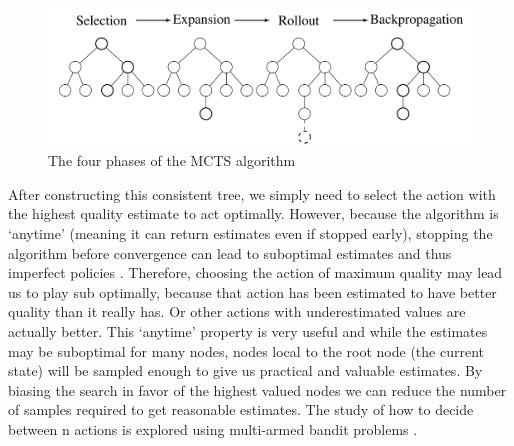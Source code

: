 \documentclass[msc, deptreport, ai, romanprepages]{infthesis}
\begin{document}
\begin{figure}[h]
\caption{The four phases of the MCTS algorithm}
\centering
\includegraphics[scale=.825]{figures/MCTS}
\end{figure}

After constructing this consistent tree, we simply need to select the action with the highest quality estimate to act optimally. However, because the algorithm is `anytime' (meaning it can return estimates even if stopped early), stopping the algorithm before convergence can lead to suboptimal estimates and thus imperfect policies \cite{Gelly}. Therefore, choosing the action of maximum quality may lead us to play sub optimally, because that action has been estimated to have better quality than it really has. Or other actions with underestimated values are actually better. This `anytime' property is very useful and while the estimates may be suboptimal for many nodes, nodes local to the root node (the current state) will be sampled enough to give us practical and valuable estimates. By biasing the search in favor of the highest valued nodes we can reduce the number of samples required to get reasonable estimates. The study of how to decide between n actions is explored using multi-armed bandit problems \cite{Gelly}.
\end{document}
